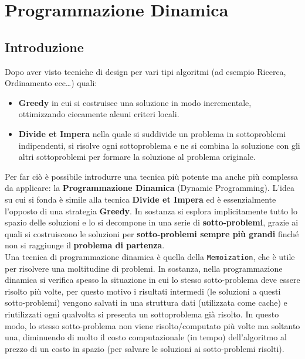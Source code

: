 
\chapter{Programmazione Dinamica}

\section{Introduzione}

Dopo aver visto tecniche di design per vari tipi algoritmi (ad esempio
Ricerca, Ordinamento ecc\ldots) quali:
\begin{itemize}
  \item \textbf{Greedy} in cui si
        costruisce una soluzione in modo incrementale, ottimizzando ciecamente
        alcuni criteri locali.
  \item \textbf{Divide et Impera} nella quale si
        suddivide un problema in sottoproblemi indipendenti, si risolve ogni
        sottoproblema e ne si combina la soluzione con gli altri sottoproblemi
        per formare la soluzione al problema originale.
\end{itemize}

Per far ciò è possibile introdurre una tecnica più potente ma anche più complessa da
applicare: la \textbf{Programmazione Dinamica} (Dynamic Programming).
L'idea su cui si fonda è simile alla tecnica \textbf{Divide et Impera}
ed è essenzialmente l'opposto di una strategia \textbf{Greedy}. In
sostanza si esplora implicitamente tutto lo spazio delle soluzioni e lo
si decompone in una serie di \textbf{sotto-problemi}, grazie ai quali si
costruiscono le soluzioni per \textbf{sotto-problemi sempre più grandi}
finché non si raggiunge il \textbf{problema di partenza}.\\

Una tecnica di programmazione dinamica è quella della
\texttt{Memoization}, che è utile per risolvere una moltitudine di
problemi. In sostanza, nella programmazione dinamica si verifica spesso
la situazione in cui lo stesso sotto-problema deve essere risolto più
volte, per questo motivo i risultati intermedi (le soluzioni a questi
sotto-problemi) vengono salvati in una struttura dati (utilizzata come
cache) e riutilizzati ogni qualvolta si presenta un sottoproblema già
risolto. In questo modo, lo stesso sotto-problema non viene
risolto/computato più volte ma soltanto una, diminuendo di molto il
costo computazionale (in tempo) dell'algoritmo al prezzo di un costo in
spazio (per salvare le soluzioni ai sotto-problemi risolti).\\


